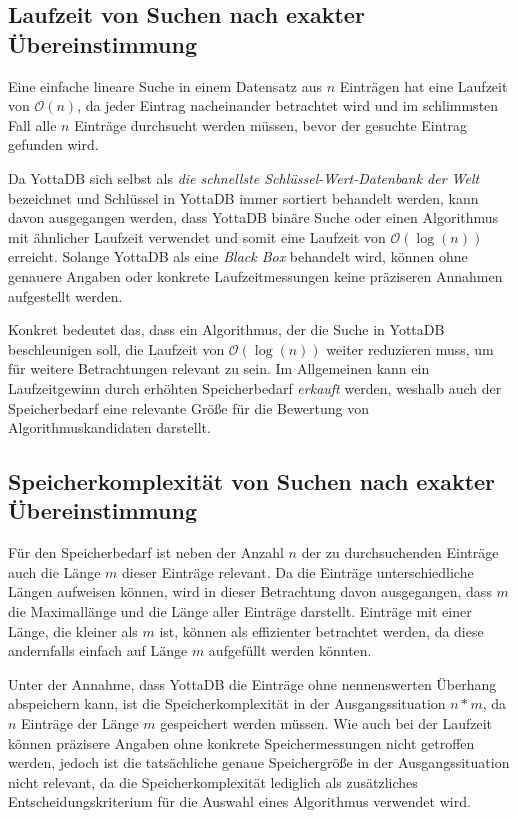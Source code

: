 \documentclass[oneside]{ausarbeitung}
\begin{document}
	
	
\subsection{Laufzeit von Suchen nach exakter Übereinstimmung}
	
Eine einfache lineare Suche in einem Datensatz aus $n$ Einträgen hat eine Laufzeit von $\mathcal{O}(n)$, da jeder Eintrag nacheinander betrachtet wird und im schlimmsten Fall alle $n$ Einträge durchsucht werden müssen, bevor der gesuchte Eintrag gefunden wird.
	
Da YottaDB sich selbst als \textit{die schnellste Schlüssel-Wert-Datenbank der Welt} bezeichnet \cite{yottadb:home} und Schlüssel in YottaDB immer sortiert behandelt werden, kann davon ausgegangen werden, dass YottaDB binäre Suche oder einen Algorithmus mit ähnlicher Laufzeit verwendet und somit eine Laufzeit von $\mathcal{O}(\log(n))$ erreicht. Solange YottaDB als eine \textit{Black Box} behandelt wird, können ohne genauere Angaben oder konkrete Laufzeitmessungen keine präziseren Annahmen aufgestellt werden.
	
Konkret bedeutet das, dass ein Algorithmus, der die Suche in YottaDB beschleunigen soll, die Laufzeit von $\mathcal{O}(\log(n))$ weiter reduzieren muss, um für weitere Betrachtungen relevant zu sein. Im Allgemeinen kann ein Laufzeitgewinn durch erhöhten Speicherbedarf \textit{erkauft} werden, weshalb auch der Speicherbedarf eine relevante Größe für die Bewertung von Algorithmuskandidaten darstellt.
	
	
	
\subsection{Speicherkomplexität von Suchen nach exakter Übereinstimmung}
	
Für den Speicherbedarf ist neben der Anzahl $n$ der zu durchsuchenden Einträge auch die Länge $m$ dieser Einträge relevant. Da die Einträge unterschiedliche Längen aufweisen können, wird in dieser Betrachtung davon ausgegangen, dass $m$ die Maximallänge und die Länge aller Einträge darstellt. Einträge mit einer Länge, die kleiner als $m$ ist, können als effizienter betrachtet werden, da diese andernfalls einfach auf Länge $m$ aufgefüllt werden könnten.
	
Unter der Annahme, dass YottaDB die Einträge ohne nennenswerten Überhang abspeichern kann, ist die Speicherkomplexität in der Ausgangssituation $n*m$, da $n$ Einträge der Länge $m$ gespeichert werden müssen. Wie auch bei der Laufzeit können präzisere Angaben ohne konkrete Speichermessungen nicht getroffen werden, jedoch ist die tatsächliche genaue Speichergröße in der Ausgangssituation nicht relevant, da die Speicherkomplexität lediglich als zusätzliches Entscheidungskriterium für die Auswahl eines Algorithmus verwendet wird.
	
\end{document}
